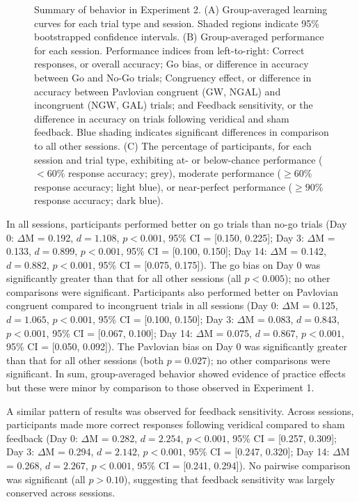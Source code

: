\documentclass[a4paper,12pt]{article}
\begin{document}
\begin{refsection}[main]
\begin{figure}[hpt]
    \centerline{}
    \caption{Summary of behavior in Experiment 2. (A) Group-averaged learning curves for each trial type and session. Shaded regions indicate 95\% bootstrapped confidence intervals. (B) Group-averaged performance for each session. Performance indices from left-to-right: Correct responses, or overall accuracy; Go bias, or difference in accuracy between Go and No-Go trials; Congruency effect, or difference in accuracy between Pavlovian congruent (GW, NGAL) and incongruent (NGW, GAL) trials; and Feedback sensitivity, or the difference in accuracy on trials following veridical and sham feedback. Blue shading indicates significant differences in comparison to all other sessions. (C) The percentage of participants, for each session and trial type, exhibiting at- or below-chance performance ($< 60\%$ response accuracy; grey), moderate performance ($\geq 60\%$ response accuracy; light blue), or near-perfect performance ($\geq 90\%$ response accuracy; dark blue).}
    \label{fig:exp02_behavior}
\end{figure}

In all sessions, participants performed better on go trials than no-go trials (Day 0: $\Delta$M = 0.192, $d = 1.108$, $p < 0.001$, 95\% CI = [0.150, 0.225]; Day 3: $\Delta$M = 0.133, $d = 0.899$, $p < 0.001$, 95\% CI = [0.100, 0.150]; Day 14: $\Delta$M = 0.142, $d = 0.882$, $p < 0.001$, 95\% CI = [0.075, 0.175]). The go bias on Day 0 was significantly greater than that for all other sessions (all $p < 0.005$); no other comparisons were significant. Participants also performed better on Pavlovian congruent compared to incongruent trials in all sessions (Day 0: $\Delta$M = 0.125, $d = 1.065$, $p < 0.001$, 95\% CI = [0.100, 0.150]; Day 3: $\Delta$M = 0.083, $d = 0.843$, $p < 0.001$, 95\% CI = [0.067, 0.100]; Day 14: $\Delta$M = 0.075, $d = 0.867$, $p < 0.001$, 95\% CI = [0.050, 0.092]). The Pavlovian bias on Day 0 was significantly greater than that for all other sessions (both $p = 0.027$); no other comparisons were significant. In sum, group-averaged behavior showed evidence of practice effects but these were minor by comparison to those observed in Experiment 1. 

A similar pattern of results was observed for feedback sensitivity. Across sessions, participants made more correct responses following veridical compared to sham feedback (Day 0: $\Delta$M = 0.282, $d = 2.254$, $p < 0.001$, 95\% CI = [0.257, 0.309]; Day 3: $\Delta$M = 0.294, $d = 2.142$, $p < 0.001$, 95\% CI = [0.247, 0.320]; Day 14: $\Delta$M = 0.268, $d = 2.267$, $p < 0.001$, 95\% CI = [0.241, 0.294]). No pairwise comparison was significant (all $p > 0.10$), suggesting that feedback sensitivity was largely conserved across sessions.


\end{refsection}
\end{document}

